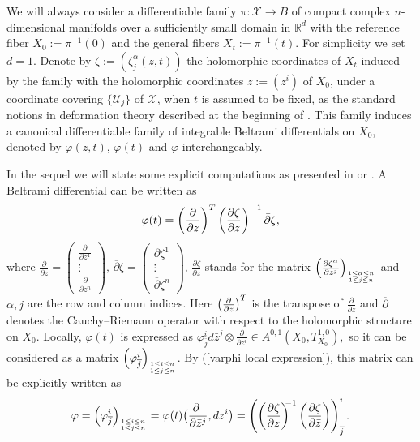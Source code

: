 \documentclass[12pt]{amsart}
\numberwithin{equation}{section}
\theoremstyle{definition}
\theoremstyle{definition}
\theoremstyle{definition}
\newcommand{\dz}{d \bar{z}}
\renewcommand{\1}{\mathsf{1}}
\newcommand{\lk}{\left(}
\newcommand{\rk}{\right)}
\renewcommand{\>}{\rightarrow}
\newcommand{\p}{\partial}
\def\p{\partial}
\def\v{\varphi}
\theoremstyle{plain} %
\theoremstyle{plain} %
\theoremstyle{plain} %
\begin{document}
	We will always consider a differentiable family $\pi:\mathcal{X} \rightarrow
	B$ of compact complex $n$-dimensional manifolds
	over a sufficiently small domain in $\mathbb{R}^d$ with the
	reference fiber $X_0:= \pi^{-1}(0)$ and the general fibers $X_t:=
	\pi^{-1}(t).$ For simplicity we set $d=1$. Denote by
	$\zeta:=(\zeta^\alpha_j(z,t))$ the holomorphic coordinates of $X_t$
	induced by the family with the holomorphic coordinates $z:=(z^i)$ of
	$X_0$, under a coordinate covering $\{\mathcal{U}_j\}$ of
	$\mathcal{X}$, when $t$ is assumed to be fixed, as the standard
	notions in deformation theory described at the beginning of
	\cite[Chapter 4]{MK71}. This family induces a canonical differentiable family of
	integrable Beltrami differentials on $X_0$, denoted by $\varphi(z,t)$,
	$\varphi(t)$ and $\varphi$ interchangeably.
	
	In the sequel we will state some explicit  computations as presented in \cite[Chapter 4.1]{MK71} or \cite[Section 2.1]{RZ18}. A Beltrami differential can be written as
	\begin{equation}\label{varphi local expression}
		\varphi(t)=\left(\frac{\partial}{\partial z}\right)^{\rm{T}}\left(\frac{\partial \zeta}{\partial z}\right)^{-1} \bar{\partial} \zeta,
	\end{equation}
	where $\frac{\partial}{\partial z}=\left(\begin{array}{c}\frac{\partial}{\partial z^{1}} \\ \vdots \\ \frac{\partial}{\partial z^{n}}\end{array}\right), \,\overline{\partial} \zeta=\left(\begin{array}{c}\overline\partial \zeta^{1} \\ \vdots \\ \overline{\partial} \zeta^{n}\end{array}\right), \,\frac{\partial \zeta}{\partial z}$ stands for the matrix $\left(\frac{\partial \zeta^{\alpha}}{\partial z^{j}}\right)_{1 \leq \alpha \leq n \atop 1 \leq j \leq n}$ and $\alpha, j$ are the row and column indices. Here $\left(\frac{\partial}{\partial z}\right)^{\rm T}$ is the transpose of $\frac{\partial}{\partial z}$ and $\overline{\partial}$ denotes the Cauchy--Riemann operator with respect to the holomorphic structure on $X_{0}.$
	Locally, $\varphi(t)$ is expressed as ${\varphi_{\overline j}^i}\dz^j\otimes\frac{\p}{\p z^i}\in A^{0,1}(X_0,T_{X_0}^{1,0}),$ so it can be considered as a matrix ${\left(\v^i _{\overline j}\right)}_{1 \leq i \leq n \atop 1 \leq j \leq n}$. By (\ref{varphi local expression}), this matrix   can be explicitly written as
	\begin{equation}\label{6666}
		\varphi= {\left(\v^i _{\overline{ j}}\right)}_{1 \leq i \leq n \atop 1 \leq j \leq n}=\varphi(t)\big( \frac{\p\ }{\p \bar{z}^j}, dz^i \big)
		= \lk \lk \frac{\p \zeta}{\p z} \rk^{\!\!\!-1} \lk \frac{\p \zeta}{\p \bar{z}} \rk
		\rk^i_{\overline{ j}}.
	\end{equation}
    
\end{document}
